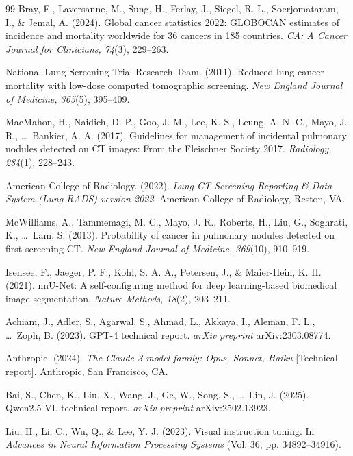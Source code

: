 \documentclass[12pt]{article}
\begin{document}
\begin{thebibliography}{99}
\small
\setlength{\bibsep}{2pt plus 1pt}
Bray, F., Laversanne, M., Sung, H., Ferlay, J., Siegel, R. L., Soerjomataram, I., \& Jemal, A. (2024). Global cancer statistics 2022: GLOBOCAN estimates of incidence and mortality worldwide for 36 cancers in 185 countries. \textit{CA: A Cancer Journal for Clinicians, 74}(3), 229--263.

National Lung Screening Trial Research Team. (2011). Reduced lung-cancer mortality with low-dose computed tomographic screening. \textit{New England Journal of Medicine, 365}(5), 395--409.

MacMahon, H., Naidich, D. P., Goo, J. M., Lee, K. S., Leung, A. N. C., Mayo, J. R., \ldots\ Bankier, A. A. (2017). Guidelines for management of incidental pulmonary nodules detected on CT images: From the Fleischner Society 2017. \textit{Radiology, 284}(1), 228--243.

American College of Radiology. (2022). \textit{Lung CT Screening Reporting \& Data System (Lung-RADS) version 2022}. American College of Radiology, Reston, VA.

McWilliams, A., Tammemagi, M. C., Mayo, J. R., Roberts, H., Liu, G., Soghrati, K., \ldots\ Lam, S. (2013). Probability of cancer in pulmonary nodules detected on first screening CT. \textit{New England Journal of Medicine, 369}(10), 910--919.

Isensee, F., Jaeger, P. F., Kohl, S. A. A., Petersen, J., \& Maier-Hein, K. H. (2021). nnU-Net: A self-configuring method for deep learning-based biomedical image segmentation. \textit{Nature Methods, 18}(2), 203--211.

Achiam, J., Adler, S., Agarwal, S., Ahmad, L., Akkaya, I., Aleman, F. L., \ldots\ Zoph, B. (2023). GPT-4 technical report. \textit{arXiv preprint} arXiv:2303.08774.

Anthropic. (2024). \textit{The Claude 3 model family: Opus, Sonnet, Haiku} [Technical report]. Anthropic, San Francisco, CA.

Bai, S., Chen, K., Liu, X., Wang, J., Ge, W., Song, S., \ldots\ Lin, J. (2025). Qwen2.5-VL technical report. \textit{arXiv preprint} arXiv:2502.13923.

Liu, H., Li, C., Wu, Q., \& Lee, Y. J. (2023). Visual instruction tuning. In \textit{Advances in Neural Information Processing Systems} (Vol. 36, pp. 34892--34916).


\end{thebibliography}
\end{document}
